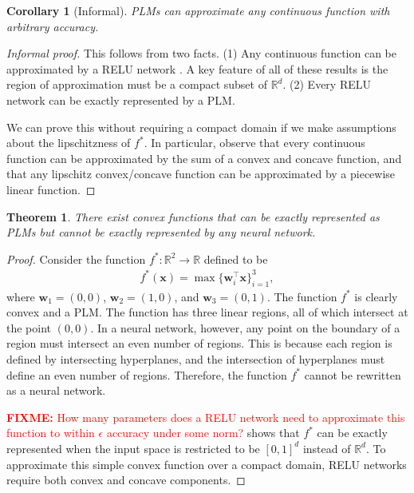 \documentclass{article}
\newtheorem{corollary}{Corollary}
\newtheorem{theorem}{Theorem}
\newcommand{\R}{\mathbb{R}}
\newcommand{\trans}[1]{{#1}^{\top}}
\newcommand{\w}{\mathbf w}
\newcommand{\x}{\mathbf{x}}
\newcommand{\f}{f}
\newcommand{\fstar}{\f^*}
\newcommand{\fixme}[1]{\textcolor{red}{\textbf{FIXME:} {#1}}}
\begin{document}

\begin{corollary}[Informal]
PLMs can approximate any continuous function with arbitrary accuracy.
\end{corollary}
\begin{proof}[Informal proof]
This follows from two facts.
(1) Any continuous function can be approximated by a RELU network \citep{mhaskar1992approximation,leshno1992multilayer,pinkus1999approximation}.
A key feature of all of these results is the region of approximation must be a compact subset of $\R^d$.
(2) Every RELU network can be exactly represented by a PLM.

We can prove this without requiring a compact domain if we make assumptions about the lipschitzness of $\fstar$.
In particular, observe that every continuous function can be approximated by the sum of a convex and concave function,
and that any lipschitz convex/concave function can be approximated by a piecewise linear function.
\end{proof}


\begin{theorem}
There exist convex functions that can be exactly represented as PLMs
but cannot be exactly represented by any neural network.
\label{thm:plm:max3}
\end{theorem}
\begin{proof}
Consider the function $\fstar : \R^2 \to \R$ defined to be
\begin{align}
    \fstar(\x) = \max\{\trans\w_i\x\}_{i=1}^3,
\end{align}
where $\w_1=(0,0)$, $\w_2=(1,0)$, and $\w_3=(0,1)$.
The function $\fstar$ is clearly convex and a PLM.
The function has three linear regions, all of which intersect at the point $(0,0)$.
In a neural network, however, any point on the boundary of a region must intersect an even number of regions.
This is because each region is defined by intersecting hyperplanes,
and the intersection of hyperplanes must define an even number of regions.
Therefore, the function $\fstar$ cannot be rewritten as a neural network.

\fixme{How many parameters does a RELU network need to approximate this function to within $\epsilon$ accuracy under some norm?}
\citet{hanin2017universal} shows that $\fstar$ can be exactly represented when the input space is restricted to be $[0,1]^d$ instead of $\R^d$.
To approximate this simple convex function over a compact domain,
RELU networks require both convex and concave components.
\end{proof}
\end{document}
